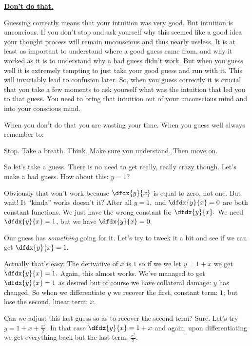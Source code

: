 \begin{Digression}
  \centerline{\underline{\bf{}Don't do that.}}

  Guessing correctly means that your intuition was very good. But
  intuition is unconcious. If you don't stop and ask yourself why this
  seemed like a good idea your thought process will remain unconscious
  and thus nearly useless. It is at least as important to understand
  where a good guess came from, and why it worked as it is to
  understand why a bad guess didn't work. But when you guess well it
  is extremely tempting to just take your good guess and run with
  it. This will invariably lead to confusion later. So, when you guess
  correctly it is crucial that you take a few moments to ask yourself
  what was the intuition that led you to that guess. You need to bring
  that intuition out of your unconscious mind and into your conscious
  mind.

  When you don't do that you are wasting your time. When you guess
  well always remember to:
  \begin{center}
    \vskip3mm{} {\sc{}\underline{Stop.}\vskip3mm{} Take a breath.  \vskip3mm{}
      \underline{Think.} \vskip3mm{}Make sure you \underline{understand.}
      \vskip3mm{} \underline{Then} move on.}  \vskip3mm{}
  \end{center}
\end{Digression}

So let's take a guess. There is no need to get really, really crazy
though. Let's make a bad guess.
How about this: $y = 1?$

Obviously that won't work because $\dfdx{y}{x}$ is equal to zero, not
one. But wait! It ``kinda'' works doesn't it? After all $y=1,$ and
$\dfdx{y}{x}=0$ are both constant functions. We just have the wrong
constant for $\dfdx{y}{x}.$ We need $\dfdx{y}{x}=1$, but we have
$\dfdx{y}{x}=0.$

Our guess has \emph{something} going for it. Let's try to tweek it a bit and
see if we can get $\dfdx{y}{x}=1.$

Actually that's easy. The derivative of $x$ is $1$ so if we we let
$y=1+x$ we get $\dfdx{y}{x} = 1.$ Again, this almost works.  We've
managed to get $\dfdx{y}{x}=1$ as desired but of course we have collateral
damage: $y$ has changed. So when we differentiate $y$ we
recover the first, constant term: $1$; but lose the second, linear
term: $x.$

Can we adjust this last guess so as to recover the second term?
Sure. Let's try $y=1+x+\frac{x^2}{2}.$ In that case
$\dfdx{y}{x} = 1+x$ and again, upon differentiating we get everything
back but the last term: $\frac{x^2}{2}.$

